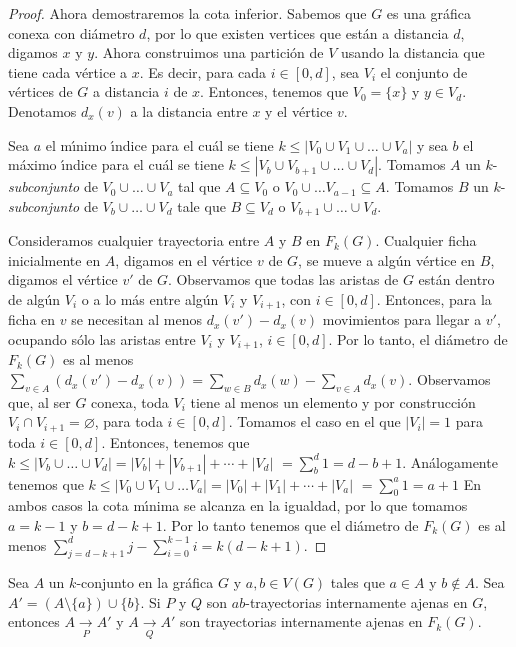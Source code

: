 \begin{proof}
Ahora demostraremos la cota inferior. Sabemos que $G$ es una gr\'afica conexa
con di\'ametro $d$, por lo que existen vertices que est\'an a distancia
$d$, digamos $x$ y $y$. Ahora construimos una partici\'on de $V$ usando  la
distancia que tiene cada v\'ertice a $x$. Es decir, para cada $i\in [0,d]$,
sea $V_{i}$ el conjunto de v\'ertices de $G$ a distancia $i$ de $x$. Entonces,
tenemos que $V_{0}=\{x\}$ y $y\in V_{d}$. Denotamos $d_x(v)$ a la distancia
entre $x$ y el v\'ertice $v$.

Sea $a$ el m\'\i{}nimo \'\i{}ndice para el cu\'al se tiene $k \leq |V_{0}\cup
V_{1}\cup \dots \cup V_{a}|$ y sea $b$ el m\'aximo \'\i{}ndice para el cu\'al se
tiene $k\leq |V_{b}\cup V_{b+1}\cup \dots \cup V_{d}|$. Tomamos $A$ un
$k$-\textit{subconjunto} de $V_{0}\cup \dots \cup V_{a}$  tal que $A\subseteq
V_{0}$ o $V_{0}\cup \dots V_{a-1}\subseteq A$. Tomamos $B$ un
$k$-\textit{subconjunto} de $V_{b}\cup \dots \cup V_{d}$ tale que
$B\subseteq V_{d}$ o $V_{b+1}\cup \dots \cup V_{d}$. 

Consideramos cualquier trayectoria entre $A$ y $B$ en $F_{k}(G)$. Cualquier
ficha inicialmente en $A$, digamos en el v\'ertice $v$ de $G$, se mueve a
alg\'un v\'ertice en $B$, digamos el v\'ertice $v'$ de $G$. Observamos que todas
las aristas de $G$ est\'an dentro de alg\'un $V_{i}$ o a lo m\'as entre alg\'un
$V_{i}$ y $V_{i+1}$, con $i\in[0,d]$. Entonces, para la ficha en $v$ se
necesitan al menos $d_x(v')-d_x(v)$ movimientos para llegar a $v'$, ocupando
s\'olo las aristas entre $V_{i}$ y $V_{i+1}$, $i\in [0,d]$. Por lo tanto,
el di\'ametro de $F_{k}(G)$ es al menos $\sum_{v\in A}(d_x(v')-d_x(v))=
\sum_{w\in B}d_x(w)-\sum_{v\in A}d_x(v)$. Observamos que, al ser $G$ conexa,
toda $V_{i}$ tiene al menos un elemento y por construcci\'on $V_{i} \cap
V_{i+1}=\varnothing$, para toda $i\in [0,d]$. Tomamos el caso en el que
$|V_{i}|=1$ para toda $i\in [0,d]$. Entonces, tenemos que $k\leq
|V_{b}\cup\dots\cup V_{d}|=|V_{b}|+|V_{b+1}|+\cdots +|V_d|$
$=\sum_{b}^{d}1 = d -b+1$. An\'alogamente tenemos que $k\leq
|V_{0}\cup V_{1}\cup \dots V_{a}|=|V_{0}|+|V_{1}|+\cdots + |V_{a}|$
$=\sum_{0}^{a} 1 = a+1$ En ambos casos la cota m\'\i{}nima se alcanza en la
igualdad, por lo que tomamos $a=k-1$ y $b=d-k+1$. Por lo tanto tenemos que
el di\'ametro de $F_{k}(G)$ es al menos $\sum_{j=d -k+1}^{d}j -
\sum_{i=0}^{k-1}i = k(d-k+1)$.
\end{proof}


\begin{lema}%
\label{lem:primero}
Sea $A$ un $k$-conjunto en la gr\'afica $G$ y $a, b \in V(G)$ tales que $a \in
A$ y $b \notin A$. Sea $A' = (A \setminus \{ a \}) \cup \{ b \}$. Si $P$ y $Q$
son $ab$-trayectorias internamente ajenas en $G$, entonces $A \xrightarrow[P]{}
A'$ y $A \xrightarrow[Q]{} A'$ son trayectorias internamente ajenas en
$F_{k}(G)$.
\end{lema}

